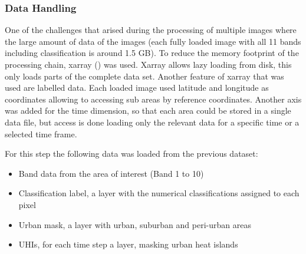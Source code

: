 \documentclass[12pt,a4paper, english,twoside]{article}
\begin{document}
    \subsubsection{Data Handling}
      One of the challenges that arised during the processing of multiple images where the large amount of data of the images (each fully loaded image with all 11 bands including classification is around 1.5 GB).
      To reduce the memory footprint of the processing chain, xarray (\autocite{hoyer2017xarray}) was used. 
      Xarray allows lazy loading from disk, this only loads parts of the complete data set. 
      Another feature of xarray that was used are labelled data. Each loaded image used latitude and longitude as coordinates allowing to accessing sub areas by reference coordinates. 
      Another axis was added for the time dimension, so that each area could be stored in a single data file, but access is done loading only the relevant data for a specific time or a selected time frame.
  
      For this step the following data was loaded from the previous dataset: 
      \begin{itemize}
        \item Band data from the area of interest (Band 1 to 10)
        \item Classification label, a layer with the numerical classifications assigned to each pixel 
        \item Urban mask, a layer with urban, suburban and peri-urban areas
        \item \glspl{UHI}, for each time step a layer, masking urban heat islands
      \end{itemize}
\end{document}
